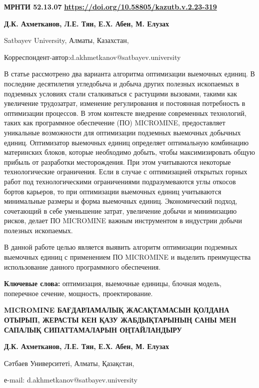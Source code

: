 \newpage
{}
{\bfseries МРНТИ 52.13.07}
\hfill {\bfseries \href{https://doi.org/10.58805/kazutb.v.2.23-319}{https://doi.org/10.58805/kazutb.v.2.23-319}}


\begin{center}
{\bfseries Д.К. Ахметканов\envelope, Л.Е. Тян, Е.Х. Абен, М. Елузах}

Satbayev University, Алматы, Казахстан,

\envelope Корреспондент-автор:d.akhmetkanov@satbayev.university
\end{center}

В статье рассмотрено два варианта алгоритма оптимизации выемочных
единиц. В последние десятилетия угледобыча и добыча других полезных
ископаемых в подземных условиях стали сталкиваться с растущими вызовами,
такими как увеличение трудозатрат, изменение регулирования и постоянная
потребность в оптимизации процессов. В этом контексте внедрение
современных технологий, таких как программное обеспечение (ПО)
MICROMINE, предоставляет уникальные возможности для оптимизации
подземных выемочных добычных единиц. Оптимизатор выемочных единиц
определяет оптимальную комбинацию материнских блоков, которые необходимо
добыть, чтобы максимизировать общую прибыль от разработки месторождения.
При этом учитываются некоторые технологические ограничения. Если в
случае с оптимизацией открытых горных работ под технологическими
ограничениями подразумеваются углы откосов бортов карьеров, то при
оптимизации выемочных единиц учитываются минимальные размеры и форма
выемочных единиц. Экономический подход, сочетающий в себе уменьшение
затрат, увеличение добычи и минимизацию рисков, делает ПО MICROMINE
важным инструментом в индустрии добычи полезных ископаемых.

В данной работе целью является выявить алгоритм оптимизации подземных
выемочных единиц с применением ПО MICROMINE и выделить преимущества
использование данного программного обеспечения.

{\bfseries Ключевые слова:} оптимизация, выемочные единицы, блочная модель,
поперечное сечение, мощность, проектирование.

\begin{center}
{\large\bfseries MICROMINE БАҒДАРЛАМАЛЫҚ ЖАСАҚТАМАСЫН ҚОЛДАНА ОТЫРЫП, ЖЕРАСТЫ КЕН
ҚАЗУ ЖАБДЫҚТАРЫНЫҢ САНЫ МЕН САПАЛЫҚ СИПАТТАМАЛАРЫН ОҢТАЙЛАНДЫРУ}

{\bfseries Д.К. Ахметканов\envelope, Л.Е. Тян, Е.Х. Абен, М.
Елузах}

Сәтбаев Университеті, Алматы, Қазақстан,

е-mail: d.akhmetkanov@satbayev.university
\end{center}

